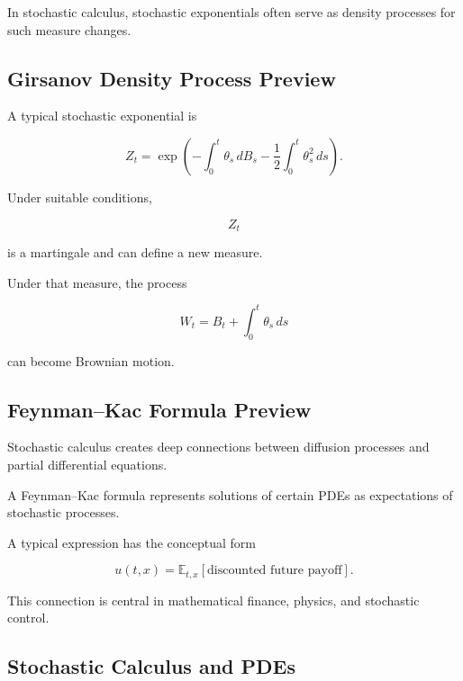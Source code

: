 In stochastic calculus, stochastic exponentials often serve as density
processes for such measure changes.

\subsection{Girsanov Density Process Preview}
\label{subsec:girsanov-density-preview}

A typical stochastic exponential is

\[
\boxed{
Z_t
=
\exp
\left(
-\int_0^t
\theta_s\,dB_s
-
\frac12
\int_0^t
\theta_s^2\,ds
\right).
}
\]

Under suitable conditions,

\[
Z_t
\]

is a martingale and can define a new measure.

Under that measure, the process

\[
\boxed{
W_t
=
B_t
+
\int_0^t
\theta_s\,ds
}
\]

can become Brownian motion.

\subsection{Feynman--Kac Formula Preview}
\label{subsec:feynman-kac-preview}

Stochastic calculus creates deep connections between diffusion
processes and partial differential equations.

A Feynman--Kac formula represents solutions of certain PDEs as
expectations of stochastic processes.

A typical expression has the conceptual form

\[
\boxed{
u(t,x)
=
\mathbb{E}_{t,x}
\left[
\text{discounted future payoff}
\right].
}
\]

This connection is central in mathematical finance, physics, and
stochastic control.

\subsection{Stochastic Calculus and PDEs}
\label{subsec:stochastic-calculus-pdes}

